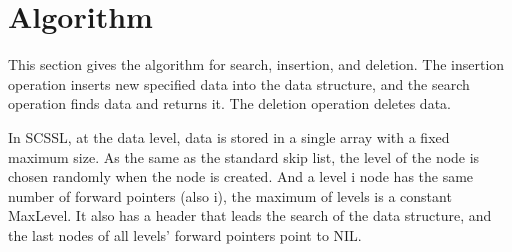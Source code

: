 \documentclass{article}
\begin{document}
\section{Algorithm}
This section gives the algorithm for search, insertion, and deletion. The insertion operation inserts new specified data into the data structure, and the search operation finds data and returns it. The deletion operation deletes data. 

In SCSSL, at the data level, data is stored in a single array with a fixed maximum size. As the same as the standard skip list, the level of the node is chosen randomly when the node is created. And a level i node has the same number of forward pointers (also i), the maximum of levels is a constant MaxLevel. It also has a header that leads the search of the data structure, and the last nodes of all levels’ forward pointers point to NIL.
\end{document}

